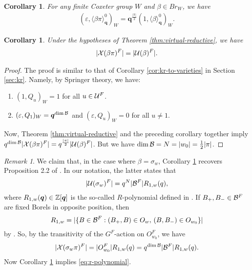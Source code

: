 \documentclass[a4paper,10pt,leqno]{amsart}
\theoremstyle{plain}
\theoremstyle{plain}
\theoremstyle{plain}
\newtheorem{cor}[thm]{Corollary}
\theoremstyle{definition}
\theoremstyle{remark}
\newtheorem{rem}[thm]{Remark}
\newcommand{\Br}{\mathit{Br}}
\newcommand{\Q}{\bm{q}}
\newcommand{\Tr}[1]{\langle{#1}\rangle_{\Q}}
\begin{document}
\begin{cor}
For any finite Coxeter group $W$ and $\beta \in \Br_W$, we have
\begin{align}
(\varepsilon, \Tr{\beta\pi}^0)_W = \Q^{\frac{|\pi|}{2}} (1, \Tr{\beta}^0)_W.
\end{align}
\end{cor}

\begin{cor}\label{cor:virtual}
Under the hypotheses of Theorem \ref{thm:virtual-reductive}, we have
\begin{align}
|\cal{X}(\beta\pi)^F| = |\cal{U}(\beta)^F|.
\end{align}
\end{cor}

\begin{proof}
The proof is similar to that of Corollary \ref{cor:kr-to-varieties} in Section \ref{sec:kr}.
Namely, by Springer theory, we have:
\begin{enumerate}
\item 	$(1, Q_u)_W = 1$ for all $u \in \cal{U}^F$.
\item 	$(\varepsilon, Q_1)_W = \Q^{\dim \cal{B}}$ and $(\varepsilon, Q_u)_W = 0$ for all $u \neq 1$.
\end{enumerate}
Now, Theorem \ref{thm:virtual-reductive} and the preceding corollary together imply $q^{\dim \cal{B}} |\cal{X}(\beta\pi)^F| = q^{\frac{|\pi|}{2}} |\cal{U}(\beta)^F|$.
But we have $\dim \cal{B} = N = |w_0| = \frac{1}{2}|\pi|$.
\end{proof}

\begin{rem}
We claim that, in the case where $\beta = \sigma_w$, Corollary \ref{cor:virtual} recovers Proposition 2.2 of \cite{lusztig_2021}.
In our notation, the latter states that 
\begin{align}\label{eq:r-polynomial}
|\cal{U}(\sigma_w)^F| = q^N |\cal{B}^F| R_{1, w}(q),
\end{align}
where $R_{1, w}(\Q) \in \bb{Z}[\Q]$ is the so-called $R$-polynomial defined in \cite{kl}.
If $B_+, B_- \in \cal{B}^F$ are fixed Borels in opposite position, then
\begin{align}
R_{1, w} = |\{B \in \cal{B}^F : (B_+, B) \in O_w,\, (B, B_-) \in O_{w_0}\}|
\end{align}
by \cite[Lem.\ A.4]{kl}.
So, by the transitivity of the $G^F$-action on $O_{w_0}^F$, we have
\begin{align}
|\cal{X}(\sigma_w\pi)^F| = |O_{w_0}^F| R_{1, w}(q) 
= q^{\dim \cal{B}} |\cal{B}^F| R_{1, w}(q).
\end{align}
Now Corollary \ref{cor:virtual} implies \eqref{eq:r-polynomial}.

\end{rem}
\end{document}

